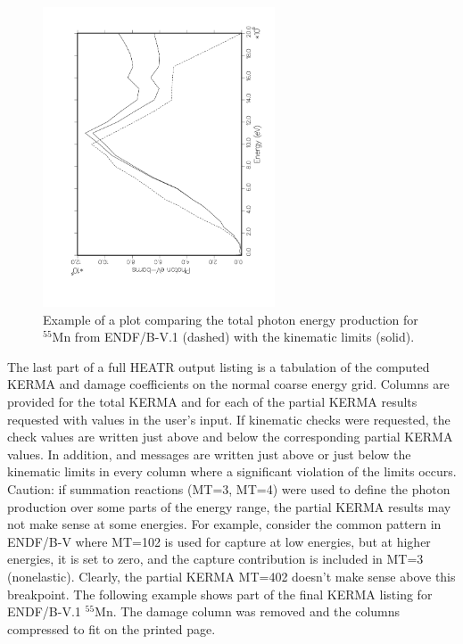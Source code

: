 \begin{figure}[bp]\centering
\includegraphics[keepaspectratio,height=3.5in, angle=270]{figs/heatr4ack}
\caption[Total photon energy production and kinematic limits for $^{55}$Mn]
{Example of a plot comparing the total photon energy production for
  $^{55}$Mn from ENDF/B-V.1 (dashed) with the kinematic limits (solid).}
\label{he4}
\end{figure}

The last part of a full HEATR output listing is a tabulation of
the computed KERMA and damage coefficients on the normal coarse
energy grid.  Columns are provided for the total KERMA and
for each of the partial KERMA results requested with 
values in the user's input.  If kinematic checks were requested,
the check values are written just above and below the corresponding
partial KERMA values.  In addition,  and 
messages are written just above or just below the kinematic limits
in every column where a significant violation of the limits occurs.
Caution: if summation reactions (MT=3, MT=4) were used to define
the photon production over some parts of the energy range, the
partial KERMA results may not make sense at some energies.  For
example, consider the common pattern in ENDF/B-V where MT=102
is used for capture at low energies, but at higher energies, it
is set to zero, and the capture contribution is included in MT=3
(nonelastic).  Clearly, the partial KERMA MT=402 doesn't make
sense above this breakpoint.  The following example shows part
of the final KERMA listing for ENDF/B-V.1 $^{55}$Mn.  The
damage column was removed and the columns compressed to fit
on the printed page.

